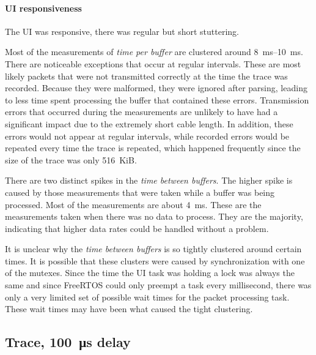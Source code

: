 \paragraph{UI responsiveness}

The UI was responsive, there was regular but short stuttering.
\bigbreak

Most of the measurements of \textit{time per buffer} are clustered around \SIrange{8}{10}{\milli\second}.
There are noticeable exceptions that occur at regular intervals. These are most likely packets that
were not transmitted correctly at the time the trace was recorded. Because they were malformed, they
were ignored after parsing, leading to less time spent processing the buffer that contained these
errors. Transmission errors that occurred during the measurements are unlikely to have had a significant
impact due to the extremely short cable length. In addition, these errors would not appear at regular
intervals, while recorded errors would be repeated every time the trace is repeated, which happened
frequently since the size of the trace was only \SI{516}{KiB}.

There are two distinct spikes in the \textit{time between buffers}. The higher spike is caused by
those measurements that were taken while a buffer was being processed. Most of the measurements are
about \SI{4}{\milli\second}. These are the measurements taken when there was no data to process.
They are the majority, indicating that higher data rates could be handled without a problem.

It is unclear why the \textit{time between buffers} is so tightly clustered around certain times.
It is possible that these clusters were caused by synchronization with one of the mutexes. Since the
time the UI task was holding a lock was always the same and since FreeRTOS could only preempt a task
every millisecond, there was only a very limited set of possible wait times for the packet processing
task. These wait times may have been what caused the tight clustering.

\clearpage
\subsection{Trace, \SI{100}{\micro\second} delay}
\label{evaluation/results/trace-100us-delay}


